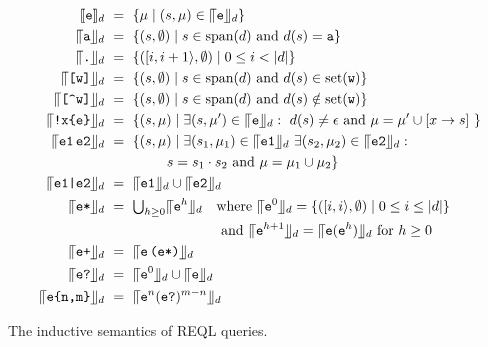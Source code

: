 \begin{table}
	\begin{align*}
		\llbracket\texttt{e}\rrbracket_{d} & \ = \  \{ \mu \mid (s, \mu) \in \llceil{\texttt{e}}\rrfloor_{d} \}\\
		\llceil{\texttt{a}}\rrfloor_{d} & \ = \  \{ (s, \emptyset) \mid s \in \text{span}(d) \text{ and } d(s) = \texttt{a} \}\\
		\llceil{\texttt{.}}\rrfloor_{d} & \ = \  \{ ([i,i+1\rangle, \emptyset) \mid 0 \leq i < |d| \}\\
		\llceil{\texttt{[w]}}\rrfloor_{d} & \ = \  \{ (s, \emptyset) \mid s \in \text{span}(d) \text{ and } d(s) \in  \text{set}(\texttt{w}) \}\\
		\llceil{\texttt{[\textasciicircum w]}}\rrfloor_{d} & \ = \  \{ (s, \emptyset) \mid s \in \text{span}(d) \text{ and } d(s) \notin  \text{set}(\texttt{w}) \}\\
		\llceil{\texttt{!x\{e\}}}\rrfloor_{d} & \ = \  \{ (s, \mu) \mid \exists (s, \mu') \in \llceil{\texttt{e}}\rrfloor_{d}: \ d(s) \neq \epsilon \text{ and }
		\mu =  \mu'  \cup [x \to s] \ \} \\
		\llceil{\texttt{e1} \, \texttt{e2}}\rrfloor_{d} & \ = \  \{ (s, \mu) \mid
		\exists (s_1, \mu_1) \in \llceil{\texttt{e1}}\rrfloor_{d} \ \exists (s_2, \mu_2) \in \llceil{\texttt{e2}}\rrfloor_{d}: \\
		& \;\;\;\;\;\;\;\;\;\;\;\;\;\;\;\; s = s_1 \cdot s_2 \text{ and } \mu = \mu_1 \cup \mu_2 \}\\
		\llceil{\texttt{e1|e2}}\rrfloor_{d} & \ = \  \llceil{\texttt{e1}}\rrfloor_{d} \cup \llceil{\texttt{e2}}\rrfloor_{d}\\
		\llceil{\texttt{e*}}\rrfloor_{d} & \ = \  {\textstyle\bigcup}_{h\geq 0}\llceil{\texttt{e}^h}\rrfloor_{d} \quad \text{where } \llceil{\texttt{e}^0}\rrfloor_{d} = \{([i,i\rangle, \emptyset) \mid 0 \leq i \leq |d|\}\ \\
		& \qquad\qquad\qquad\qquad \text{ and } \llceil{\texttt{e}^{h+1}}\rrfloor_{d} = \llceil{\texttt{e}(\texttt{e}^h)}\rrfloor_{d} \text{ for } h \geq 0 \\
		\llceil{\texttt{e+}}\rrfloor_{d} & \ = \  \llceil{\texttt{e}\, \texttt{(e*)}}\rrfloor_{d} \\
		\llceil{\texttt{e?}}\rrfloor_{d} & \ = \  \llceil{\texttt{e}^0}\rrfloor_{d} \cup \llceil{\texttt{e}}\rrfloor_{d} \\
		\llceil{\texttt{e\{n,m\}}}\rrfloor_{d} & \ = \  \llceil{\texttt{e}^n(\texttt{e?})^{m-n}}\rrfloor_{d}
	\end{align*}
	\vspace*{-10pt}
	\caption{The inductive semantics of REQL queries.}
	\label{tab-semantics}	
	\vspace{-5mm}
\end{table}

